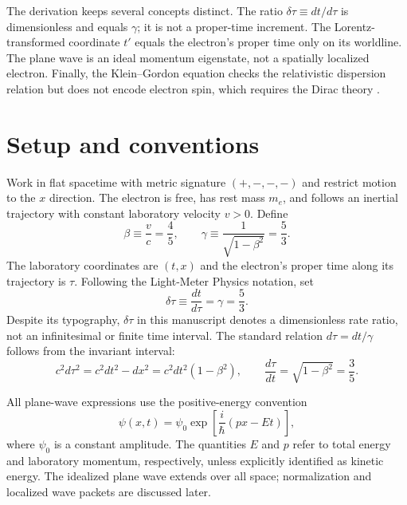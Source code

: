 \documentclass[12pt]{article}
\begin{document}
The derivation keeps several concepts distinct. The ratio $\delta\tau\equiv dt/d\tau$ is dimensionless and equals $\gamma$; it is not a proper-time increment. The Lorentz-transformed coordinate $t'$ equals the electron's proper time only on its worldline. The plane wave is an ideal momentum eigenstate, not a spatially localized electron. Finally, the Klein--Gordon equation checks the relativistic dispersion relation but does not encode electron spin, which requires the Dirac theory \cite{Dirac1928}.

\section{Setup and conventions}

Work in flat spacetime with metric signature $(+,-,-,-)$ and restrict motion to the $x$ direction. The electron is free, has rest mass $m_e$, and follows an inertial trajectory with constant laboratory velocity $v>0$. Define
\begin{equation}
  \beta\equiv\frac{v}{c}=\frac{4}{5},
  \qquad
  \gamma\equiv\frac{1}{\sqrt{1-\beta^2}}=\frac{5}{3}.
  \label{eq:beta-gamma}
\end{equation}
The laboratory coordinates are $(t,x)$ and the electron's proper time along its trajectory is $\tau$. Following the Light-Meter Physics notation, set
\begin{equation}
  \delta\tau\equiv\frac{dt}{d\tau}=\gamma=\frac{5}{3}.
  \label{eq:clock-rate-ratio}
\end{equation}
Despite its typography, $\delta\tau$ in this manuscript denotes a dimensionless rate ratio, not an infinitesimal or finite time interval. The standard relation $d\tau=dt/\gamma$ follows from the invariant interval:
\begin{equation}
  c^2d\tau^2=c^2dt^2-dx^2
  =c^2dt^2(1-\beta^2),
  \qquad
  \frac{d\tau}{dt}=\sqrt{1-\beta^2}=\frac{3}{5}.
  \label{eq:proper-time}
\end{equation}

All plane-wave expressions use the positive-energy convention
\begin{equation}
  \psi(x,t)=\psi_0\exp\!\left[\frac{i}{\hbar}(px-Et)\right],
  \label{eq:phase-convention}
\end{equation}
where $\psi_0$ is a constant amplitude. The quantities $E$ and $p$ refer to total energy and laboratory momentum, respectively, unless explicitly identified as kinetic energy. The idealized plane wave extends over all space; normalization and localized wave packets are discussed later.
\end{document}
